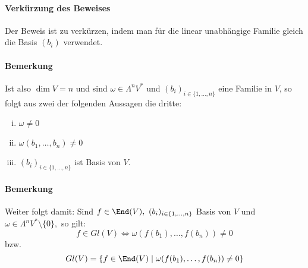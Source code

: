 \paragraph{Verkürzung des Beweises}
	Der Beweis ist zu verkürzen, indem man für die linear unabhängige Familie gleich die Basis $ (b_i) $ verwendet.
\paragraph{Bemerkung}
	Ist also $ \dim V=n $ und sind $ \omega\in \Lambda^nV^* $ und $ (b_i)_{i\in \{1,\dots,n\}} $ eine Familie in $ V $, so folgt aus zwei der folgenden Aussagen die dritte:
		\begin{enumerate}[(i)]
			\item $ \omega\neq 0 $
			\item $ \omega(b_1,\dots,b_n)\neq 0 $
			\item $ (b_i)_{i\in\{1,\dots,n\}} $ ist Basis von $ V $.
		\end{enumerate}
\paragraph{Bemerkung}
	Weiter folgt damit: Sind $ f\in \End(V),\ (b_i)_{i\in \{1,\dots,n\}} $ Basis von $ V $ und $ \omega\in \Lambda^nV^*\setminus\{0\}, $ so gilt:
		\[ f\in Gl(V)\Leftrightarrow \omega(f(b_1),\dots,f(b_n))\neq 0 \]
	bzw.
		\[ Gl(V)=\{f\in \End(V)\mid \omega(f(b_1),\dots,f(b_n))\neq 0\} \]
